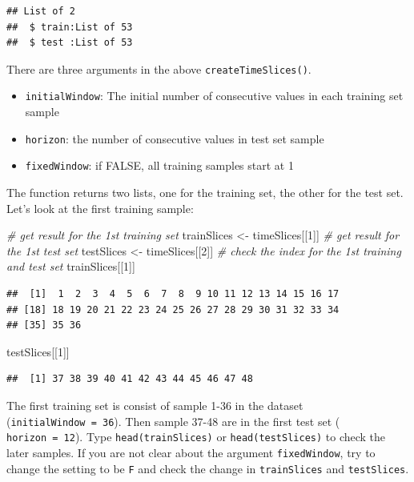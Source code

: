 \documentclass[12pt,]{krantz}
\makeatletter
\newenvironment{Shaded}{\begin{snugshade}}{\end{snugshade}}
\newcommand{\CommentTok}[1]{\textcolor[rgb]{0.37,0.37,0.37}{\textit{#1}}}
\newcommand{\DecValTok}[1]{\textcolor[rgb]{0.06,0.06,0.06}{#1}}
\newcommand{\NormalTok}[1]{#1}
\newcommand{\StringTok}[1]{\textcolor[rgb]{0.5,0.5,0.5}{#1}}
\providecommand{\tightlist}{%
  \setlength{\itemsep}{0pt}\setlength{\parskip}{0pt}}
\newenvironment{kframe}{%
\medskip{}
\setlength{\fboxsep}{.8em}
 \def\at@end@of@kframe{}%
 \ifinner\ifhmode%
  \def\at@end@of@kframe{\end{minipage}}%
  \begin{minipage}{\columnwidth}%
 \fi\fi%
 \def\FrameCommand##1{\hskip\@totalleftmargin \hskip-\fboxsep
 \colorbox{shadecolor}{##1}\hskip-\fboxsep
     \hskip-\linewidth \hskip-\@totalleftmargin \hskip\columnwidth}%
 \MakeFramed {\advance\hsize-\width
   \@totalleftmargin\z@ \linewidth\hsize
   \@setminipage}}%
 {\par\unskip\endMakeFramed%
 \at@end@of@kframe}
\renewenvironment{Shaded}{\begin{kframe}}{\end{kframe}}
\makeatother
\begin{document}
\begin{verbatim}
## List of 2
##  $ train:List of 53
##  $ test :List of 53
\end{verbatim}

There are three arguments in the above \texttt{createTimeSlices()}.

\begin{itemize}
\tightlist
\item
  \texttt{initialWindow}: The initial number of consecutive values in each training set sample
\item
  \texttt{horizon}: the number of consecutive values in test set sample
\item
  \texttt{fixedWindow}: if FALSE, all training samples start at 1
\end{itemize}

The function returns two lists, one for the training set, the other for the test set. Let's look at the first training sample:

\begin{Shaded}
\begin{Highlighting}[]
\CommentTok{# get result for the 1st training set}
\NormalTok{trainSlices <-}\StringTok{ }\NormalTok{timeSlices[[}\DecValTok{1}\NormalTok{]]}
\CommentTok{# get result for the 1st test set}
\NormalTok{testSlices <-}\StringTok{ }\NormalTok{timeSlices[[}\DecValTok{2}\NormalTok{]]}
\CommentTok{# check the index for the 1st training and test set}
\NormalTok{trainSlices[[}\DecValTok{1}\NormalTok{]]}
\end{Highlighting}
\end{Shaded}

\begin{verbatim}
##  [1]  1  2  3  4  5  6  7  8  9 10 11 12 13 14 15 16 17
## [18] 18 19 20 21 22 23 24 25 26 27 28 29 30 31 32 33 34
## [35] 35 36
\end{verbatim}

\begin{Shaded}
\begin{Highlighting}[]
\NormalTok{testSlices[[}\DecValTok{1}\NormalTok{]]}
\end{Highlighting}
\end{Shaded}

\begin{verbatim}
##  [1] 37 38 39 40 41 42 43 44 45 46 47 48
\end{verbatim}

The first training set is consist of sample 1-36 in the dataset (\texttt{initialWindow\ =\ 36}). Then sample 37-48 are in the first test set ( \texttt{horizon\ =\ 12}). Type \texttt{head(trainSlices)} or \texttt{head(testSlices)} to check the later samples. If you are not clear about the argument \texttt{fixedWindow}, try to change the setting to be \texttt{F} and check the change in \texttt{trainSlices} and \texttt{testSlices}.
\end{document}
